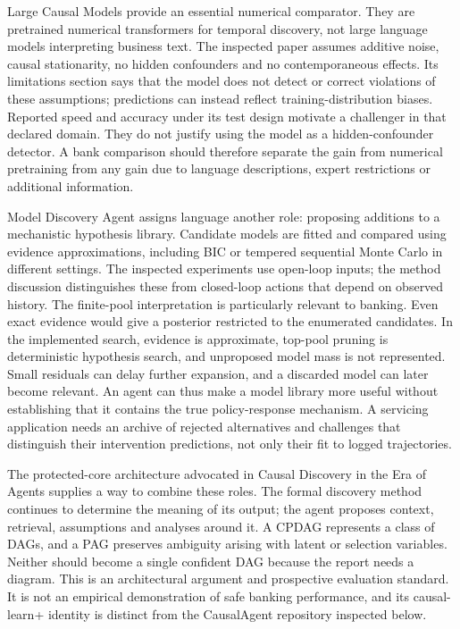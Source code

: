 Large Causal Models provide an essential numerical comparator. They are
pretrained numerical transformers for temporal discovery, not large language
models interpreting business text. The inspected paper assumes additive
noise, causal stationarity, no hidden confounders and no contemporaneous
effects. Its limitations section says that the model does not detect or
correct violations of these assumptions; predictions can instead reflect
training-distribution biases. Reported speed and accuracy under its test
design motivate a challenger in that declared domain. They do not justify
using the model as a hidden-confounder detector. A bank comparison should
therefore separate the gain from numerical pretraining from any gain due to
language descriptions, expert restrictions or additional information.
\citep{v12_la_2602_18662}

Model Discovery Agent assigns language another role: proposing additions to
a mechanistic hypothesis library. Candidate models are fitted and compared
using evidence approximations, including BIC or tempered sequential Monte
Carlo in different settings. The inspected experiments use open-loop inputs;
the method discussion distinguishes these from closed-loop actions that
depend on observed history. The finite-pool interpretation is particularly
relevant to banking. Even exact evidence would give a posterior restricted
to the enumerated candidates. In the implemented search, evidence is
approximate, top-pool pruning is deterministic hypothesis search, and
unproposed model mass is not represented. Small residuals can delay further
expansion, and a discarded model can later become relevant. An agent can
thus make a model library more useful without establishing that it contains
the true policy-response mechanism. A servicing application needs an archive
of rejected alternatives and challenges that distinguish their intervention
predictions, not only their fit to logged trajectories.
\citep{v12_la_2608_09696}

The protected-core architecture advocated in Causal Discovery in the Era of
Agents supplies a way to combine these roles. The formal discovery method
continues to determine the meaning of its output; the agent proposes context,
retrieval, assumptions and analyses around it. A CPDAG represents a class of
DAGs, and a PAG preserves ambiguity arising with latent or selection
variables. Neither should become a single confident DAG because the report
needs a diagram. This is an architectural argument and prospective
evaluation standard. It is not an empirical demonstration of safe banking
performance, and its causal-learn+ identity is distinct from the CausalAgent
repository inspected below.
\citep{v12_la_2606_23608}

